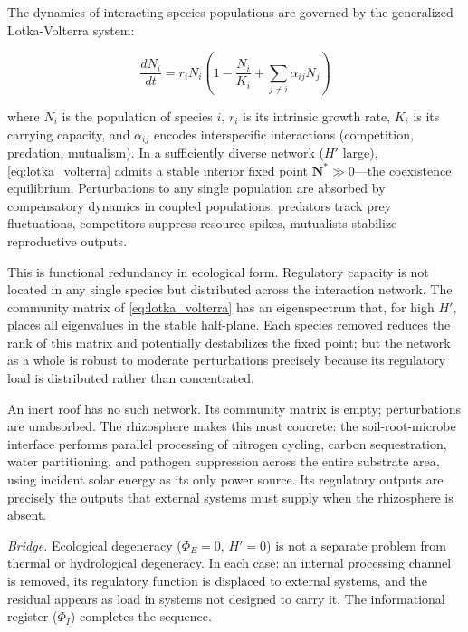 \documentclass[12pt, a4paper]{article}
\theoremstyle{plain}
\theoremstyle{remark}
\begin{document}
The dynamics of interacting species populations are governed by the generalized Lotka-Volterra system:

\begin{equation}
\frac{dN_i}{dt} = r_i N_i\!\left(1 - \frac{N_i}{K_i} + \sum_{j \neq i} \alpha_{ij} N_j\right)
\label{eq:lotka_volterra}
\end{equation}

\noindent where $N_i$ is the population of species $i$, $r_i$ is its intrinsic growth rate, $K_i$ is its carrying capacity, and $\alpha_{ij}$ encodes interspecific interactions (competition, predation, mutualism). In a sufficiently diverse network ($H'$ large), \eqref{eq:lotka_volterra} admits a stable interior fixed point $\mathbf{N}^* \gg 0$---the coexistence equilibrium. Perturbations to any single population are absorbed by compensatory dynamics in coupled populations: predators track prey fluctuations, competitors suppress resource spikes, mutualists stabilize reproductive outputs.

This is functional redundancy in ecological form. Regulatory capacity is not located in any single species but distributed across the interaction network. The community matrix of \eqref{eq:lotka_volterra} has an eigenspectrum that, for high $H'$, places all eigenvalues in the stable half-plane. Each species removed reduces the rank of this matrix and potentially destabilizes the fixed point; but the network as a whole is robust to moderate perturbations precisely because its regulatory load is distributed rather than concentrated.

An inert roof has no such network. Its community matrix is empty; perturbations are unabsorbed. The rhizosphere makes this most concrete: the soil-root-microbe interface performs parallel processing of nitrogen cycling, carbon sequestration, water partitioning, and pathogen suppression across the entire substrate area, using incident solar energy as its only power source. Its regulatory outputs are precisely the outputs that external systems must supply when the rhizosphere is absent.

\medskip
\noindent\textit{Bridge.}\; Ecological degeneracy ($\Phi_E = 0$, $H' = 0$) is not a separate problem from thermal or hydrological degeneracy. In each case: an internal processing channel is removed, its regulatory function is displaced to external systems, and the residual appears as load in systems not designed to carry it. The informational register ($\Phi_I$) completes the sequence.
\end{document}
